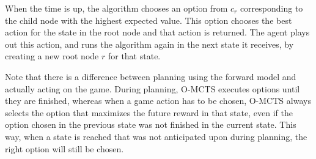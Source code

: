 When the time is up, the algorithm chooses an option from $c_r$ corresponding to
the child node with the highest expected value. This option chooses the best
action for the state in the root node and that action is returned. The agent
plays out this action, and runs the algorithm again in the next state it
receives, by creating a new root node $r$ for that state. 

Note that there is a difference between planning using the forward model and
actually acting on the game. During planning, O-MCTS executes options until they are
finished, whereas when a game action has to be chosen, O-MCTS always selects the
option that maximizes the future reward in that state, even if the option chosen
in the previous state was not finished in the current state. This way, when a
state is reached that was not anticipated upon during planning, the right option
will still be chosen.

